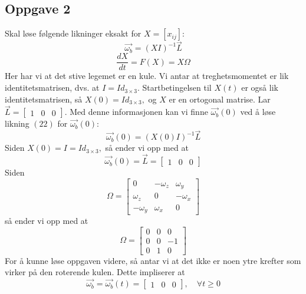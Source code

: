 \subsection{Oppgave 2}
Skal løse følgende likninger eksakt for $X=[x_{ij}]:$
\begin{equation}
    \vec{\omega_b}=(XI)^{-1}\vec{L}
\end{equation}
\begin{equation}
    \frac{dX}{dt}=F(X)=X\Omega
\end{equation}
Her har vi at det stive legemet er en kule. Vi antar at treghetsmomentet er lik identitetsmatrisen, dvs. at $I=Id_{3\times3}.$ Startbetingelsen til $X(t)$ er også lik identitetsmatrisen, så $X(0)=Id_{3\times3},$ og $X$ er en ortogonal matrise. Lar $\vec{L}=\begin{bmatrix}1&0&0\end{bmatrix}.$\newline\newline
Med denne informasjonen kan vi finne $\vec{\omega_b}(0)$ ved å løse likning $(22)$ for $\vec{\omega_b}(0):$
\begin{equation}
    \vec{\omega_b}(0)=(X(0)I)^{-1}\vec{L}
\end{equation}
Siden $X(0)=I=Id_{3\times3},$ så ender vi opp med at
\begin{equation}
    \vec{\omega_b}(0)=\vec{L}=\begin{bmatrix}1&0&0\end{bmatrix}
\end{equation}
Siden
\begin{equation}
    \Omega=\begin{bmatrix}0&-\omega_z&\omega_y\\\omega_z&0&-\omega_x\\-\omega_y&\omega_x&0\end{bmatrix}
\end{equation}
så ender vi opp med at 
\begin{equation}
    \Omega=\begin{bmatrix}0&0&0\\0&0&-1\\0&1&0\end{bmatrix}
\end{equation}
For å kunne løse oppgaven videre, så antar vi at det ikke er noen ytre krefter som virker på den roterende kulen. Dette impliserer at
\begin{equation}
    \vec{\omega_b}=\vec{\omega_b}(t)=\begin{bmatrix}1&0&0\end{bmatrix},\quad\forall t\geq0
\end{equation}
